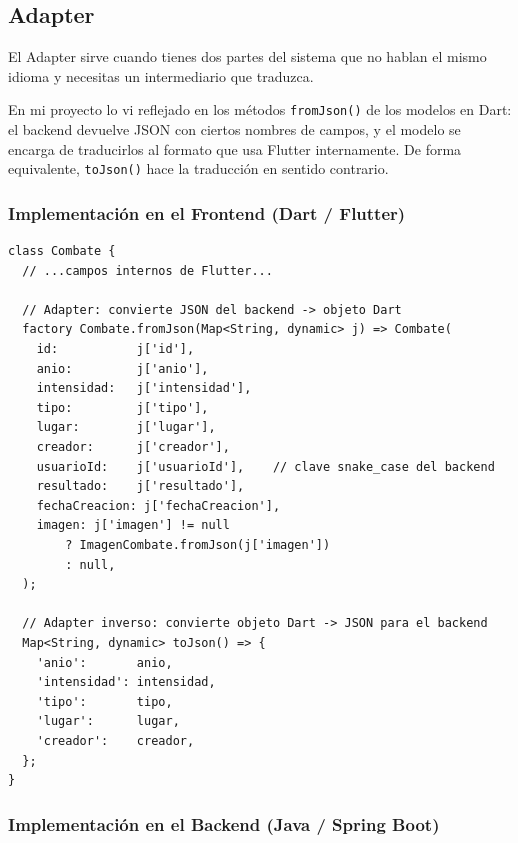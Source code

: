 \documentclass{article}
\begin{document}
\subsection{Adapter}
 
El Adapter sirve cuando tienes dos partes del sistema que no hablan el
mismo idioma y necesitas un intermediario que traduzca.
 
En mi proyecto lo vi reflejado en los m\'etodos \texttt{fromJson()} de los
modelos en Dart: el backend devuelve JSON con ciertos nombres de campos, y el
modelo se encarga de traducirlos al formato que usa Flutter internamente. De
forma equivalente, \texttt{toJson()} hace la traducci\'on en sentido contrario.
 
\subsubsection*{Implementaci\'on en el Frontend (Dart / Flutter)}
 
\begin{lstlisting}[style=dartStyle, caption={Adapter JSON$\leftrightarrow$Dart en el modelo Combate (lib/models/combate.dart)}]
class Combate {
  // ...campos internos de Flutter...
 
  // Adapter: convierte JSON del backend -> objeto Dart
  factory Combate.fromJson(Map<String, dynamic> j) => Combate(
    id:           j['id'],
    anio:         j['anio'],
    intensidad:   j['intensidad'],
    tipo:         j['tipo'],
    lugar:        j['lugar'],
    creador:      j['creador'],
    usuarioId:    j['usuarioId'],    // clave snake_case del backend
    resultado:    j['resultado'],
    fechaCreacion: j['fechaCreacion'],
    imagen: j['imagen'] != null
        ? ImagenCombate.fromJson(j['imagen'])
        : null,
  );
 
  // Adapter inverso: convierte objeto Dart -> JSON para el backend
  Map<String, dynamic> toJson() => {
    'anio':       anio,
    'intensidad': intensidad,
    'tipo':       tipo,
    'lugar':      lugar,
    'creador':    creador,
  };
}
\end{lstlisting}
 
\subsubsection*{Implementaci\'on en el Backend (Java / Spring Boot)}
 
\end{document}
